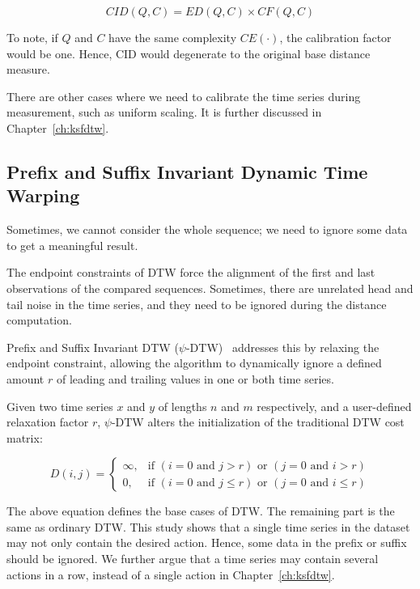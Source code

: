 \begin{equation}
    CID(Q,C) = ED(Q,C) \times CF(Q,C)
\end{equation}

To note, if $Q$ and $C$ have the same complexity $CE(\cdot)$, the calibration factor would be one.
Hence, CID would degenerate to the original base distance measure.

There are other cases where we need to calibrate the time series during measurement, such as uniform scaling.
It is further discussed in Chapter~\ref{ch:ksfdtw}.

\subsection{Prefix and Suffix Invariant Dynamic Time Warping} %

Sometimes, we cannot consider the whole sequence; we need to ignore some data to get a meaningful result.

The endpoint constraints of DTW force the alignment of the first and last observations of the compared sequences.
Sometimes, there are unrelated head and tail noise in the time series, and they need to be ignored during the distance computation.

Prefix and Suffix Invariant DTW ($\psi$-DTW)~\cite{silva2016prefix} addresses this by relaxing the endpoint constraint, allowing the algorithm to dynamically ignore a defined amount $r$ of leading and trailing values in one or both time series.

Given two time series $x$ and $y$ of lengths $n$ and $m$ respectively, and a user-defined relaxation factor $r$, $\psi$-DTW alters the initialization of the traditional DTW cost matrix:

\begin{equation}
    D(i,j) = \begin{cases} \infty, & \text{if } (i = 0 \text{ and } j > r) \text{ or } (j = 0 \text{ and } i > r) \\ 0, & \text{if } (i = 0 \text{ and } j \le r) \text{ or } (j = 0 \text{ and } i \le r) \end{cases}
\end{equation}

The above equation defines the base cases of DTW. The remaining part is the same as ordinary DTW.
This study shows that a single time series in the dataset may not only contain the desired action. Hence, some data in the prefix or suffix should be ignored.
We further argue that a time series may contain several actions in a row, instead of a single action in Chapter~\ref{ch:ksfdtw}.

